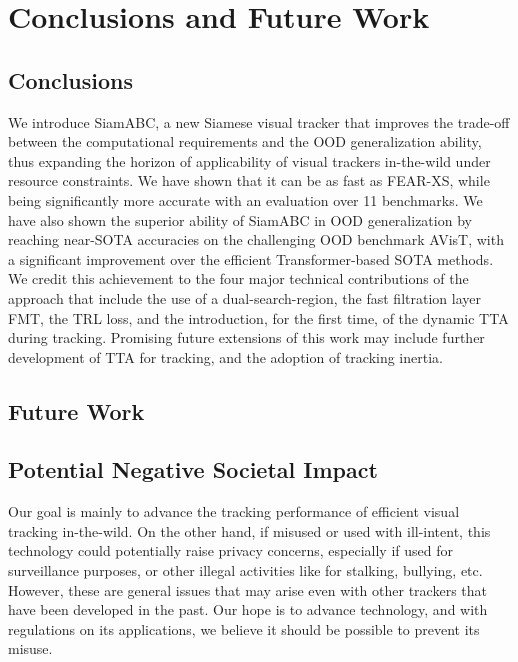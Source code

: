 
\chapter{Conclusions and Future Work} %

\label{Chapter6} %


\section{Conclusions}
We introduce SiamABC, a new Siamese visual tracker that improves the trade-off between the computational requirements and the OOD generalization ability, thus expanding the horizon of applicability of visual trackers in-the-wild under resource constraints. We have shown that it can be as fast as FEAR-XS, while being significantly more accurate with an evaluation over 11 benchmarks. We have also shown the superior ability of SiamABC in OOD generalization by reaching near-SOTA accuracies on the challenging OOD benchmark AVisT, with a significant improvement over the efficient Transformer-based SOTA methods. We credit this achievement to the four major technical contributions of the approach that include the use of a dual-search-region, the fast filtration layer FMT, the TRL loss, and the introduction, for the first time, of the dynamic TTA during tracking. Promising future extensions of this work may include further development of TTA for tracking, and the adoption of tracking inertia.


\section{Future Work}

\section{Potential Negative Societal Impact}
Our goal is mainly to advance the tracking performance of efficient visual tracking in-the-wild. On the other hand, if misused or used with ill-intent, this technology could potentially raise privacy concerns, especially if used for surveillance purposes, or other illegal activities like for stalking, bullying, etc. However, these are general issues that may arise even with other trackers that have been developed in the past. Our hope is to advance technology, and with regulations on its applications, we believe it should be possible to prevent its misuse.